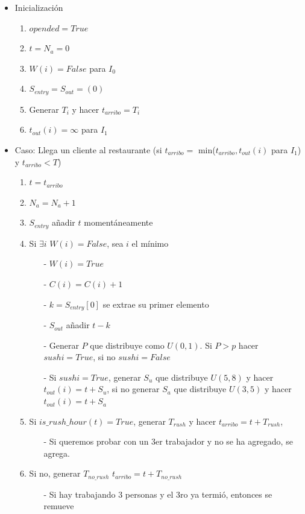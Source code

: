 \documentclass[11pt]{article}
\begin{document}
\begin{itemize}
	\item Inicializaci\'on 
	\begin{enumerate}
		\item $opended = True$
		\item $t = N_a = 0$
		\item $W(i)  = False$ para $I_0$
		\item $S_{entry} = S_{out} = (0)$ 	
		\item  Generar $T_i$ y hacer $t_{arribo} = T_i$
		\item  $t_{out}(i)= \infty$ para $I_1$
	\end{enumerate}
	\item Caso: Llega un cliente al restaurante (si $t_{arribo} = $ min($t_{arribo},t_{out}(i)$ para $I_{1}$) y $t_{arribo} < T$)
		\begin{enumerate}
		\item $t = t_{arribo}$
		\item $N_a = N_a + 1$
		\item $S_{entry} $ a\~nadir $t$ moment\'aneamente
		\item Si $\exists i$ $ W(i)=False$, sea $i$ el m\'inimo
		\begin{enumerate}
			\item [-]$W(i) = True$
			\item [-]$C(i) = C(i) + 1$
			\item [-] $k = S_{entry}[0] $ se extrae su primer elemento
			\item [-]$S_{out}$ a\~nadir $t - k$
			\item [-]Generar $P$ que distribuye como $U(0,1)$. Si $P>p$ hacer $sushi = True$, si no $sushi= False$
			\item [-]Si $sushi = True$, generar $S_u$ que distribuye $U(5,8)$ y hacer $t_{out}(i)=t+S_u$, si no generar $S_a$ que distribuye $U(3,5)$ y hacer $t_{out}(i)=t+S_a$
		\end{enumerate}
	\item Si $is\_rush\_hour(t) = True$, generar $T_{rush}$ y hacer $t_{arribo} = t + T_{rush}$,
		\begin{enumerate}
			\item [-] Si queremos probar con un 3er trabajador y no se ha agregado, se agrega.
		\end{enumerate}
	\item Si no, generar $T_{no\_rush}$ $t_{arribo} = t + T_{no\_rush}$
		\begin{enumerate}
			\item [-] Si hay trabajando 3 personas y el 3ro ya termi\'o, entonces se remueve

\end{enumerate}
\end{enumerate}
\end{itemize}
\end{document}

